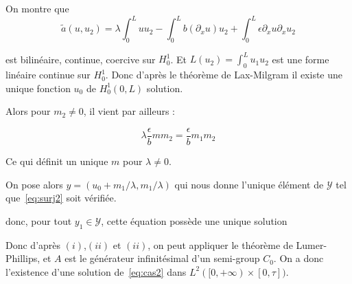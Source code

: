 \documentclass[a4paper]{article}
\newcommand{\dep}{b}
\begin{document}
\begin{preuve}
On montre que 
\[ \tilde{a}(u,u_2) = \lambda  \int_0^L u u_2 
- \int_0^L b (\partial_xu)u_2 
+\int_0^L \epsilon \partial_xu \partial_xu_2 \]

 est bilinéaire, continue, coercive sur $H_0^1$. Et $L(u_2)= \int_0^L u_1 u_2$
est une forme linéaire continue sur $H_0^1$.
Donc d'après le théorème de Lax-Milgram il existe une unique fonction $u_0$ de $H_0^1(0,L)$ solution.

Alors pour $m_2 \ne 0$, il vient par ailleurs :

\[ \displaystyle \lambda \frac{\epsilon}{\dep}mm_2 = \displaystyle \frac{\epsilon}{\dep}m_1m_2 \]

Ce qui définit un unique $m$ pour $\lambda \ne 0$.

On pose alors $y = (u_0 + m_1/\lambda, m_1/\lambda)$ 
qui nous donne l'unique élément de $\mathscr{Y}$
tel que~\eqref{eq:surj2} soit vérifiée.





donc, pour tout $y_1 \in \mathscr{Y}$, cette équation possède une unique solution 

Donc d'après $(i)$,$(ii)$ et $(ii)$, on peut appliquer le théorème de Lumer-Phillips, et $A$ est le générateur infinitésimal d'un semi-group $C_0$.
On a donc l'existence d'une solution de~\eqref{eq:cas2} dans $L^2([0,+\infty)\times[0,\tau])$.

\end{preuve}
\end{document}

